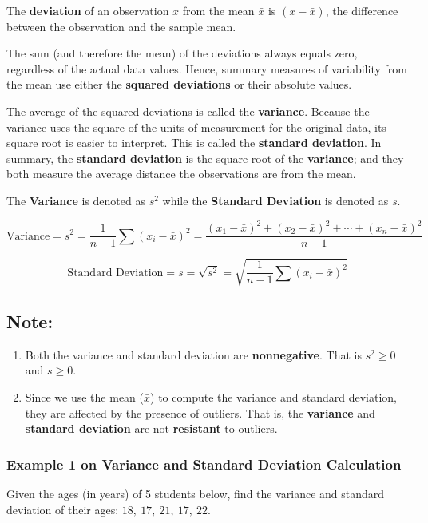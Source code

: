 The \textbf{deviation} of an observation \(x\) from the mean \(\bar{x}\) is \( (x - \bar{x}) \), the difference between the observation and the sample mean.

The sum (and therefore the mean) of the deviations always equals zero, regardless of the actual data values. Hence, summary measures of variability from the mean use either the \textbf{squared deviations} or their absolute values.

The average of the squared deviations is called the \textbf{variance}. Because the variance uses the square of the units of measurement for the original data, its square root is easier to interpret. This is called the \textbf{standard deviation}. In summary, the \textbf{standard deviation} is the square root of the \textbf{variance}; and they both measure the average distance the observations are from the mean.

The \textbf{Variance} is denoted as \( s^2 \) while the \textbf{Standard Deviation} is denoted as \( s \).

\[
\text{Variance} = s^2 = \frac{1}{n-1} \sum (x_i - \bar{x})^2 = \frac{(x_1-\bar{x})^2 + (x_2-\bar{x})^2 + \cdots + (x_n-\bar{x})^2}{n-1} 
\]

\[
\text{Standard Deviation} = s = \sqrt{s^2} = \sqrt{\frac{1}{n-1} \sum (x_i - \bar{x})^2}
\]

\subsection*{Note:}
\begin{enumerate}
    \item Both the variance and standard deviation are \textbf{nonnegative}. That is \( s^2 \geq 0 \) and \( s \geq 0 \).
    \item Since we use the mean (\( \bar{x} \)) to compute the variance and standard deviation, they are affected by the presence of outliers. That is, the \textbf{variance} and \textbf{standard deviation} are not \textbf{resistant} to outliers.
\end{enumerate}

\subsubsection*{Example 1 on Variance and Standard Deviation Calculation}

Given the ages (in years) of 5 students below, find the variance and standard deviation of their ages: \(18, \ 17, \ 21, \ 17, \ 22\).


